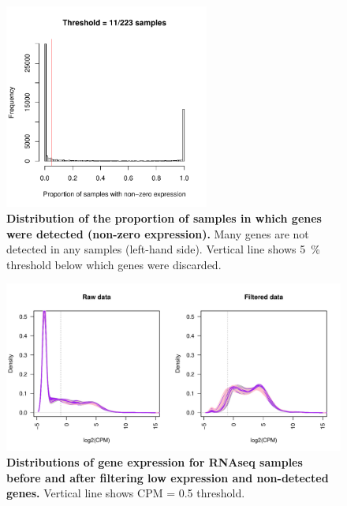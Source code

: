 \begin{figure}
    \centering
    \includegraphics[width=0.6\textwidth, page=1]{mainmatter/figures/chapter_02/rnaseq_data_setup.gene_zero_prop.pdf}
    \caption{
        \textbf{Distribution of the proportion of samples in which genes were detected (non-zero expression).}
        Many genes are not detected in any samples (left-hand side). 
        Vertical line shows \SI{5}{\percent} threshold below which genes were discarded.
    }
    \label{fig:hird_rnaseq_filtering_zeroProp}
\end{figure}

\begin{figure}
    \includegraphics[width=1.0\textwidth]{mainmatter/figures/chapter_02/rnaseq_data_setup.sample_cpm_density_filtered.pdf}
    \caption{
        \textbf{Distributions of gene expression for \gls{RNAseq} samples before and after filtering low expression and non-detected genes.}
        Vertical line shows \gls{CPM} = 0.5 threshold.
    }
    \label{fig:hird_rnaseq_cpm_filtering}
\end{figure}

